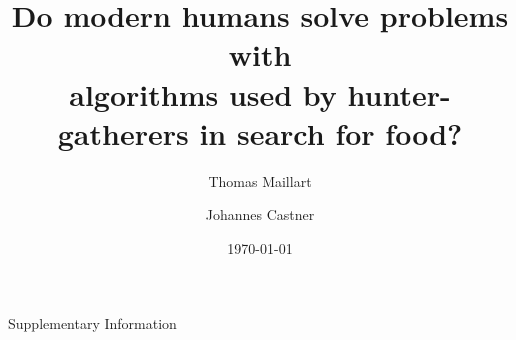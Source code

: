 \documentclass[12pt]{revtex4}
\begin{document}
\title{Do modern humans solve problems with \\ algorithms used by hunter-gatherers in search for food?}

\author{Thomas Maillart}

\author{Johannes Castner}




\date{\today}


\begin{abstract}

\end{abstract}

\maketitle


%






\clearpage





\clearpage


\clearpage
%

\renewcommand\thesection{S\arabic{section}}
\setcounter{section}{0}

\renewcommand\theequation{S\arabic{equation}}
\setcounter{equation}{0}


\begin{center}
{\Large Supplementary Information}
\vspace{3cm}
\end{center}





\end{document}
